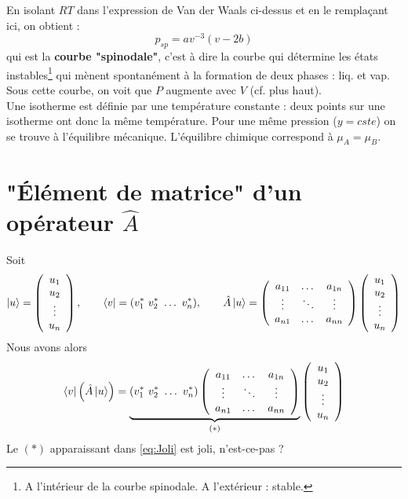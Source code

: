 \documentclass{article}
\begin{document}
	En isolant $RT$ dans l'expression de Van der Waals ci-dessus et en le remplaçant ici, on obtient :
	\begin{equation}
	p_{sp} = av^{-3}(v-2b)
	\end{equation}
	qui est la \textbf{courbe "spinodale"}, c'est à dire la courbe qui détermine les états instables\footnote{A l'intérieur de la courbe spinodale. A l'extérieur : stable.} qui mènent spontanément à la formation de deux phases : liq. et vap. Sous cette courbe, on voit que $P$ augmente avec $V$ (cf. plus haut).\\
	
	Une isotherme est définie par une température constante : deux points sur une isotherme ont donc la même température. Pour une même pression ($y = cste$) on se trouve à l'équilibre mécanique. L'équilibre chimique correspond à $\mu_A = \mu_B$.
	
	
\section{"Élément de matrice" d'un opérateur $\hat{A}$}
Soit
\begin{equation}
\ket{u} = \left(\begin{array}{c}
u_1\\
u_2\\
\vdots\\
u_n
\end{array}\right), \qquad \bra{v} = (v_1^*\ v_2^*\ \dots\ v_n^*), \qquad 
\hat{A}\ket{u} = \left(\begin{array}{ccc}
a_{11} & \dots & a_{1n}\\
\vdots &\ddots &\vdots\\
a_{n1} & \dots & a_{nn}
\end{array}\right)\left(\begin{array}{c}
u_1\\
u_2\\
\vdots\\
u_n
\end{array}\right)
\end{equation}
Nous avons alors
\begin{equation}
\bra{v}\left(\hat{A}\ket{u}\right) = \underbrace{(v_1^*\ v_2^*\ \dots\ v_n^*)\left(\begin{array}{ccc}
a_{11} & \dots & a_{1n}\\
\vdots &\ddots &\vdots\\
a_{n1} & \dots & a_{nn}
\end{array}\right)}_{(*)}\left(\begin{array}{c}
u_1\\
u_2\\
\vdots\\
u_n
\end{array}\right)
\label{eq:Joli}
\end{equation}
Le $(*)$ apparaissant dans \autoref{eq:Joli} est joli, n'est-ce-pas ? 
\end{document}
